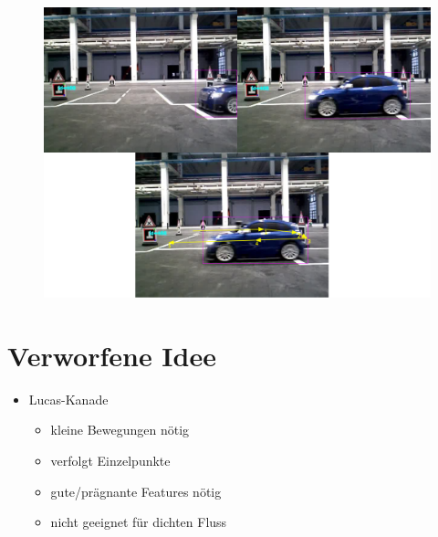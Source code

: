 \documentclass[10pt]{beamer}
\begin{document}
\begin{frame}

	\begin{figure}[h]
	\centering
	\includegraphics[scale=0.2]{./Abbildungen/08.png}
	\label{img:bsp4}
	\end{figure}

\end{frame}

\section{Verworfene Idee}
\begin{frame}{\secname}

\begin{itemize}
	\item Lucas-Kanade
	\begin{itemize}
	\item kleine Bewegungen nötig
	\item verfolgt Einzelpunkte
	\item gute/prägnante Features nötig
	\item nicht geeignet für dichten Fluss
	\end{itemize}
\end{itemize}

\end{frame}
\end{document}
